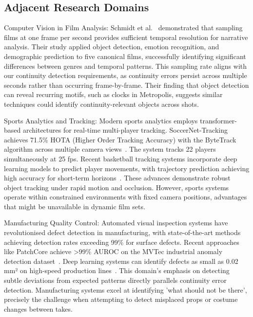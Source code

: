 \subsection{Adjacent Research Domains}

Computer Vision in Film Analysis: Schmidt et al.~\cite{schmidt2021} demonstrated that sampling films at one frame per second provides sufficient temporal resolution for narrative analysis. Their study applied object detection, emotion recognition, and demographic prediction to five canonical films, successfully identifying significant differences between genres and temporal patterns. This sampling rate aligns with our continuity detection requirements, as continuity errors persist across multiple seconds rather than occurring frame-by-frame. Their finding that object detection can reveal recurring motifs, such as clocks in Metropolis, suggests similar techniques could identify continuity-relevant objects across shots.

Sports Analytics and Tracking: Modern sports analytics employs transformer-based architectures for real-time multi-player tracking. SoccerNet-Tracking achieves 71.5\% HOTA (Higher Order Tracking Accuracy) with the ByteTrack algorithm across multiple camera views~\cite{cioppa2022}. The system tracks 22 players simultaneously at 25 fps. Recent basketball tracking systems incorporate deep learning models to predict player movements, with trajectory prediction achieving high accuracy for short-term horizons~\cite{hauri2022}. These advances demonstrate robust object tracking under rapid motion and occlusion. However, sports systems operate within constrained environments with fixed camera positions, advantages that might be unavailable in dynamic film sets.

Manufacturing Quality Control: Automated visual inspection systems have revolutionised defect detection in manufacturing, with state-of-the-art methods achieving detection rates exceeding 99\% for surface defects. Recent approaches like PatchCore achieve >99\% AUROC on the MVTec industrial anomaly detection dataset~\cite{farid2016}. Deep learning systems can identify defects as small as 0.02 mm² on high-speed production lines~\cite{wang2004}. This domain's emphasis on detecting subtle deviations from expected patterns directly parallels continuity error detection. Manufacturing systems excel at identifying 'what should not be there', precisely the challenge when attempting to detect misplaced props or costume changes between takes.

